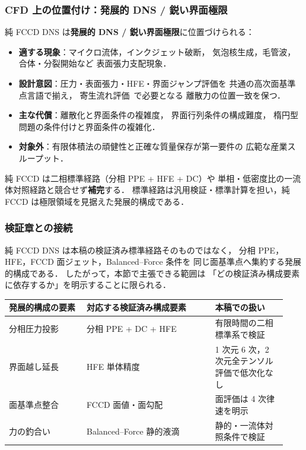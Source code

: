 \subsubsection{CFD 上の位置付け：発展的 DNS / 鋭い界面極限}
\label{sec:pure_fccd_positioning}

純 FCCD DNS は\textbf{発展的 DNS / 鋭い界面極限}に位置づけられる：

\begin{itemize}[noitemsep]
  \item \textbf{適する現象}：マイクロ流体，インクジェット破断，
        気泡核生成，毛管波，合体・分裂開始など
        表面張力支配現象．
  \item \textbf{設計意図}：圧力・表面張力・HFE・界面ジャンプ評価を
        共通の高次面基準点言語で揃え，
        寄生流れ評価~\cite{Popinet2009,Renardy2002}で必要となる
        離散力の位置一致を保つ．
  \item \textbf{主な代償}：離散化と界面条件の複雑度，
        界面行列条件の構成難度，
        楕円型問題の条件付けと界面条件の複雑化．
  \item \textbf{対象外}：有限体積法の頑健性と正確な質量保存が第一要件の
        広範な産業スループット．
\end{itemize}

純 FCCD は二相標準経路（分相 PPE + HFE + DC）や
単相・低密度比の一流体対照経路と競合せず\textbf{補完}する．
標準経路は汎用検証・標準計算を担い，純 FCCD は極限領域を見据えた発展的構成である．

\subsubsection{検証章との接続}
\label{sec:pure_fccd_gates}

純 FCCD DNS は本稿の検証済み標準経路そのものではなく，
分相 PPE，HFE，FCCD 面ジェット，Balanced--Force 条件を
同じ面基準点へ集約する発展的構成である．
したがって，本節で主張できる範囲は
「どの検証済み構成要素に依存するか」を明示することに限られる．

\begin{center}
\small
\begin{tabular}{@{}p{0.26\linewidth}p{0.43\linewidth}p{0.24\linewidth}@{}}
\hline
発展的構成の要素 & 対応する検証済み構成要素 & 本稿での扱い \\
\hline
分相圧力投影 & 分相 PPE + DC + HFE & 有限時間の二相標準系で検証 \\
界面越し延長 & HFE 単体精度 & 1 次元 6 次，2 次元全テンソル評価で低次化なし \\
面基準点整合 & FCCD 面値・面勾配 & 面評価は 4 次律速を明示 \\
力の釣合い & Balanced--Force 静的液滴 & 静的・一流体対照条件で検証 \\
\hline
\end{tabular}
\end{center}


